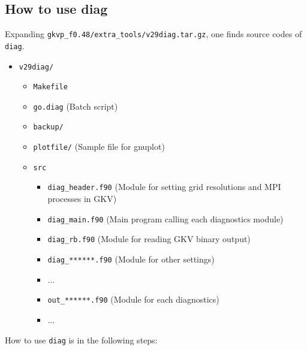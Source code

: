 \subsection{How to use diag}
Expanding \texttt{gkvp\_f0.48/extra\_tools/v29diag.tar.gz}, one finds source codes of \texttt{diag}.
\begin{itemize}
  \item \texttt{v29diag/}
  \begin{itemize}
    \item \texttt{Makefile}
    \item \texttt{go.diag} (Batch script)
    \item \texttt{backup/}
    \item \texttt{plotfile/} (Sample file for gnuplot)
    \item \texttt{src}
    \begin{itemize}
      \item \texttt{diag\_header.f90} (Module for setting grid resolutions and MPI processes in GKV)
      \item \texttt{diag\_main.f90} (Main program calling each diagnostics module)
      \item \texttt{diag\_rb.f90} (Module for reading GKV binary output)
      \item \texttt{diag\_******.f90} (Module for other settings)
      \item ...
      \item \texttt{out\_******.f90} (Module for each diagnostics)
      \item ...
    \end{itemize}
  \end{itemize} 
\end{itemize}
How to use \texttt{diag} is in the following steps:
